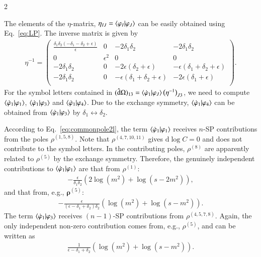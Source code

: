\documentclass[fleqn]{2023SCGE}
\newcommand{\nd}{\mathrm{d}}
\newcommand{\nds}{\hat{\mathrm{d}}}
\newcommand{\mG}{\mathcal{G}}
\newcommand{\ep}{\epsilon}
\begin{document}
\begin{multicols}{2}
\begin{appendix}
The elements of the $\eta$-matrix, $\eta_{IJ} = \braket{\varphi_I | \varphi_J}$ can be easily obtained using Eq.~\eqref{eq:LP}. The inverse matrix is given by
\begin{align}
	\eta^{-1} = \begin{pmatrix}
		\frac{\delta _1 \delta _2 \left(-\delta _1-\delta _2+\epsilon \right)}{\epsilon } & 0 & -2 \delta _1 \delta _2 & -2 \delta _1 \delta _2 \\
		0 & \epsilon ^2 & 0 & 0 \\
		-2 \delta _1 \delta _2 & 0 & -2 \epsilon  \left(\delta _2+\epsilon \right) & -\epsilon  \left(\delta _1+\delta _2+\epsilon \right) \\
		-2 \delta _1 \delta _2 & 0 & -\epsilon  \left(\delta _1+\delta _2+\epsilon \right) & -2 \epsilon  \left(\delta _1+\epsilon \right) \\
	\end{pmatrix} .
\end{align} 
For the symbol letters contained in $(\nds\Omega)_{13} = \braket{\dot{\varphi}_1 | \varphi_J} \big( \eta^{-1} \big)_{J3}$, we need to compute $\braket{\dot{\varphi}_1|\varphi_1}$, $\braket{\dot{\varphi}_1|\varphi_3}$ and $\braket{\dot{\varphi}_1|\varphi_4}$. Due to the exchange symmetry, $\braket{\dot{\varphi}_1|\varphi_4}$ can be obtained from $\braket{\dot{\varphi}_1|\varphi_3}$ by $\delta_1 \leftrightarrow \delta_2$.

According to Eq.~\eqref{eq:commonpole2l}, the term $\braket{\dot{\varphi}_1|\varphi_1}$ receives $n$-SP contributions from the poles $\rho^{(1,5,8)}$. Note that $\rho^{(4,7,10,11)}$ gives $\nd \log C=0$ and does not contribute to the symbol letters.
In the contributing poles, $\rho^{(8)}$ are apparently related to $\rho^{(5)}$ by the exchange symmetry. Therefore, the genuinely independent contributions to $\braket{\dot{\varphi}_1|\varphi_1}$ are that from $\rho^{(1)}$:
\begin{align}
-\frac{\ep}{\delta_1 \delta_2} \left( 2\log(m^2) + \log(s-2m^2) \right) ,
\end{align}
and that from, e.g., $\bm{\rho}^{(5)}$:
\begin{align}
-\frac{\ep}{(\ep-\delta_1+\delta_2) \delta_2} \left(\log(m^2) + \log(s-m^2) \right) .
\end{align}
The term $\braket{\dot{\varphi}_1|\varphi_3}$ receives $(n-1)$-SP contributions from $\rho^{(4,5,7,8)}$. Again, the only independent non-zero contribution comes from, e.g., $\rho^{(5)}$, and can be written as
\begin{align}
\frac{1}{\ep-\delta_1+\delta_2} \left( \log(m^2) + \log(s-m^2) \right). \label{eq:NPTCLetter}
\end{align}


\end{appendix}
\end{multicols}
\end{document}
